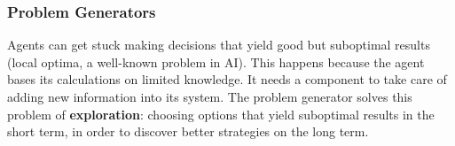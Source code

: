 \subsubsection{Problem Generators}
Agents can get stuck making decisions that yield good but suboptimal results (local optima, a well-known problem in AI).
This happens because the agent bases its calculations on limited knowledge.
It needs a component to take care of adding new information into its system.
The problem generator solves this problem of \textbf{exploration}:
choosing options that yield suboptimal results in the short term, in order to discover better strategies on the long term.

\clearpage  %